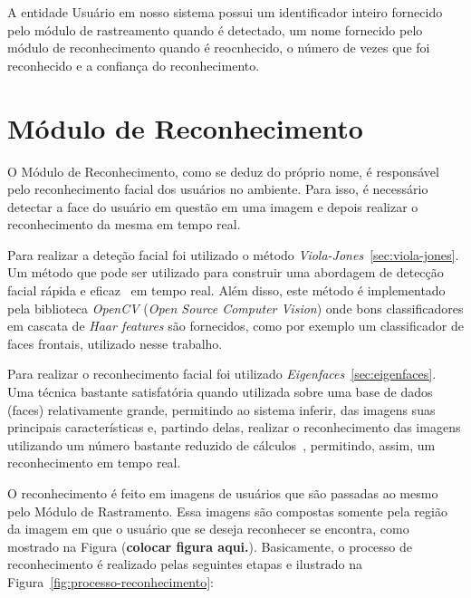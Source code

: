 A entidade Usuário em nosso sistema possui um identificador inteiro fornecido pelo módulo de rastreamento quando é detectado, um nome fornecido pelo módulo de reconhecimento quando é reocnhecido, o número de vezes que foi reconhecido e a confiança do reconhecimento.

\section{Módulo de Reconhecimento}

	O Módulo de Reconhecimento, como se deduz do próprio nome, é responsável pelo reconhecimento facial dos usuários no ambiente. Para isso, é necessário detectar a face do usuário em questão em uma imagem e depois realizar o reconhecimento da mesma em tempo real. 

	Para realizar a deteção facial foi utilizado o método \textit{Viola-Jones}~\ref{sec:viola-jones}. Um método que pode ser utilizado para construir uma abordagem de detecção facial rápida e eficaz~\cite{violajones} em tempo real. Além disso, este método é implementado pela biblioteca \textit{OpenCV} (\textit{Open Source Computer Vision}) onde bons classificadores em cascata de \textit{Haar features} são fornecidos, como por exemplo um classificador de faces frontais, utilizado nesse trabalho.

	Para realizar o reconhecimento facial foi utilizado \textit{Eigenfaces}~\ref{sec:eigenfaces}. Uma técnica bastante satisfatória quando utilizada sobre uma base de dados (faces) relativamente grande, permitindo ao sistema inferir, das imagens suas principais características e, partindo delas, realizar o reconhecimento das imagens utilizando um número bastante reduzido de cálculos~\cite{artigo-eigenface}, permitindo, assim, um reconhecimento em tempo real.

	O reconhecimento é feito em imagens de usuários que são passadas ao mesmo pelo Módulo de Rastramento. Essa imagens são compostas somente pela região da imagem em que o usuário que se deseja reconhecer se encontra, como mostrado na Figura (\textbf{colocar figura aqui.}). Basicamente, o processo de reconhecimento é realizado pelas seguintes etapas e ilustrado na Figura~\ref{fig:processo-reconhecimento}:

